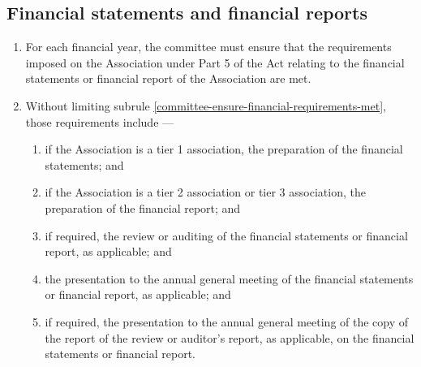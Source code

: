 \documentclass[../constitution.tex]{subfiles}
\begin{document}
\hypertarget{financial-statements-and-financial-reports}{%
  \subsection{Financial statements and financial reports}\label{financial-statements-and-financial-reports}}

\begin{enumerate}

  \item For each financial year, the committee must ensure that the requirements imposed on the Association under Part 5 of the Act relating to the financial statements or financial report of the Association are met. \label{committee-ensure-financial-requirements-met}
  \item Without limiting subrule \ref{committee-ensure-financial-requirements-met}, those requirements include ---

        \begin{enumerate}

          \item if the Association is a tier 1 association, the preparation of the financial statements; and
          \item if the Association is a tier 2 association or tier 3 association, the preparation of the financial report; and
          \item if required, the review or auditing of the financial statements or financial report, as applicable; and
          \item the presentation to the annual general meeting of the financial statements or financial report, as applicable; and
          \item if required, the presentation to the annual general meeting of the copy of the report of the review or auditor's report, as applicable, on the financial statements or financial report.
        \end{enumerate}
\end{enumerate}

\end{document}
